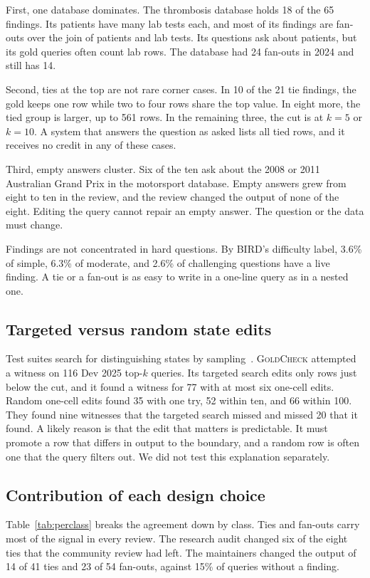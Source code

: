\documentclass[conference]{IEEEtran}
\newcommand{\sys}{\textsc{GoldCheck}}
\begin{document}
First, one database dominates. The thrombosis database holds 18 of the 65
findings. Its patients have many lab tests each, and most of its findings are
fan-outs over the join of patients and lab tests. Its questions ask about patients, but its gold queries
often count lab rows. The database had 24 fan-outs in 2024 and still has 14.

Second, ties at the top are not rare corner cases. In 10 of the 21 tie findings,
the gold keeps one row while two to four rows share the top value. In eight more,
the tied group is larger, up to 561 rows. In the remaining three, the cut is at
$k=5$ or $k=10$. A system that answers the question as asked lists all tied rows,
and it receives no credit in any of these cases.

Third, empty answers cluster. Six of the ten ask about the 2008 or 2011
Australian Grand Prix in the motorsport database. Empty answers grew from eight
to ten in the review, and the review changed the output of none of the eight.
Editing the query cannot repair an empty answer. The question or the data must
change.


Findings are not concentrated in hard questions. By BIRD's difficulty label,
3.6\% of simple, 6.3\% of moderate, and 2.6\% of challenging questions have a live
finding. A tie or a fan-out is as easy to write in a one-line query as in a
nested one.

\subsection{Targeted versus random state edits}
Test suites search for distinguishing states by sampling~\cite{zhong2020test}.
\sys{} attempted a witness on 116 Dev 2025 top-$k$ queries. Its targeted search
edits only rows just below the cut, and it found a witness for 77 with at most
six one-cell edits. Random one-cell edits found 35 with one try, 52 within ten,
and 66 within 100. They found nine witnesses that the targeted search missed and
missed 20 that it found. A likely reason is that the edit that matters is predictable. It must promote a row that differs in output to the boundary, and a random row is often one that the query filters out. We did not test this explanation separately.

\subsection{Contribution of each design choice}
\label{sec:ablation}
Table~\ref{tab:perclass} breaks the agreement down by class. Ties and fan-outs
carry most of the signal in every review. The research audit changed six of the
eight ties that the community review had left. The maintainers changed the output of 14
of 41 ties and 23 of 54 fan-outs, against 15\% of queries without a finding.
\end{document}
